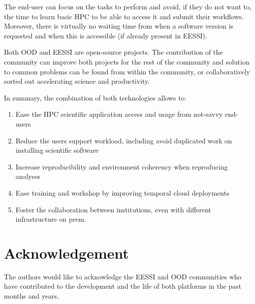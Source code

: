 \documentclass[11pt,a4paper]{article}
\begin{document}
The end-user can focus on the tasks to perform and avoid, if they do not want to, the time to learn basic HPC to be able to access it and submit their workflows. Moreover, there is virtually no waiting time from when a software version is requested and when this is accessible (if already present in EESSI).

Both OOD and EESSI are open-source projects. The contribution of the community can improve both projects for the rest of the community and solution to common problems can be found from within the community, or collaboratively sorted out accelerating science and productivity.

In summary, the combination of both technologies allows to:
\begin{enumerate}
     \item Ease the HPC scientific application access and usage from not-savvy end-users 
     \item Reduce the users support workload, including avoid duplicated work on installing scientific software
     \item Increase reproducibility and environment coherency when reproducing analyses 
     \item Ease training and workshop by improving temporal cloud deployments 
     \item Foster the collaboration between institutions, even with different infrastructure on prem. 
\end{enumerate}

\section{Acknowledgement}
The authors would like to acknowledge the EESSI  and OOD communities who have contributed to the development and the life of both platforms in the past months and years.


\printbibliography
\end{document}
